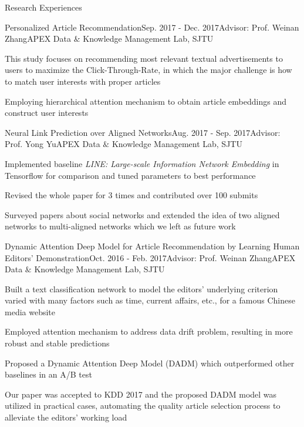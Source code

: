 \documentclass{resume} %
\begin{document}
\begin{rSection}{Research Experiences}
\begin{rSubsection}{Personalized Article Recommendation}{Sep. 2017 - Dec. 2017}{Advisor: Prof. Weinan Zhang}{APEX Data $\&$ Knowledge Management Lab, SJTU}
\item This study focuses on recommending most relevant textual advertisements to users to maximize the Click-Through-Rate, in which the major challenge is how to match user interests with proper articles
\item Employing hierarchical attention mechanism to obtain article embeddings and construct user interests
\end{rSubsection}
\begin{rSubsection}{Neural Link Prediction over Aligned Networks}{Aug. 2017 - Sep. 2017}{Advisor: Prof. Yong Yu}{APEX Data $\&$ Knowledge Management Lab, SJTU}
\item Implemented baseline \emph{LINE: Large-scale Information Network Embedding} in Tensorflow for comparison and tuned parameters to best performance
\item Revised the whole paper for 3 times and contributed over 100 submits 
\item Surveyed papers about social networks and extended the idea of two aligned networks to multi-aligned networks which we left as future work
\end{rSubsection}
\vspace{110pt}
\begin{rSubsection}{Dynamic Attention Deep Model for Article Recommendation
by Learning Human Editors’ Demonstration}{Oct. 2016 - Feb. 2017}{Advisor: Prof. Weinan Zhang}{APEX Data $\&$ Knowledge Management Lab, SJTU}
\item Built a text classification network to model the editors' underlying criterion varied with many factors such as time, current affairs, etc., for a famous Chinese media website
\item Employed attention mechanism to address data drift problem, resulting in more robust and stable predictions
\item Proposed a Dynamic Attention Deep Model (DADM) which outperformed other baselines in an A/B test
\item Our paper was accepted to KDD 2017 and the proposed DADM model was utilized in practical cases, automating the quality article selection process to alleviate the editors' working load\\\\
\end{rSubsection}
\end{rSection}
\end{document}

